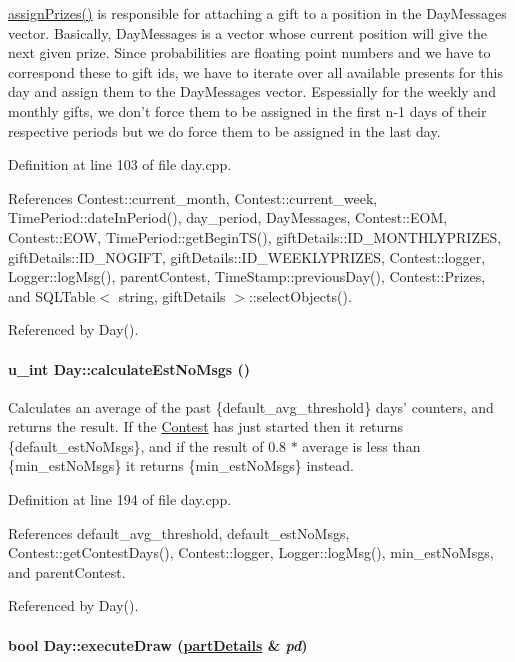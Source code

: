 \hyperlink{classDay_Daya5}{assign\-Prizes()} is responsible for attaching a gift to a position in the Day\-Messages vector. Basically, Day\-Messages is a vector whose current position will give the next given prize. Since probabilities are floating point numbers and we have to correspond these to gift ids, we have to iterate over all available presents for this day and assign them to the Day\-Messages vector. Espessially for the weekly and monthly gifts, we don't force them to be assigned in the first n-1 days of their respective periods but we do force them to be assigned in the last day. 

Definition at line 103 of file day.cpp.

References Contest::current\_\-month, Contest::current\_\-week, Time\-Period::date\-In\-Period(), day\_\-period, Day\-Messages, Contest::EOM, Contest::EOW, Time\-Period::get\-Begin\-TS(), gift\-Details::ID\_\-MONTHLYPRIZES, gift\-Details::ID\_\-NOGIFT, gift\-Details::ID\_\-WEEKLYPRIZES, Contest::logger, Logger::log\-Msg(), parent\-Contest, Time\-Stamp::previous\-Day(), Contest::Prizes, and SQLTable$<$ string, gift\-Details $>$::select\-Objects().

Referenced by Day().\hypertarget{classDay_Daya6}{
\paragraph[calculateEstNoMsgs]{\setlength{\rightskip}{0pt plus 5cm}u\_\-int Day::calculate\-Est\-No\-Msgs ()}\hfill}
\label{classDay_Daya6}


Calculates an average of the past \{default\_\-avg\_\-threshold\} days' counters, and returns the result. If the \hyperlink{classContest}{Contest} has just started then it returns \{default\_\-est\-No\-Msgs\}, and if the result of 0.8 $\ast$ average is less than \{min\_\-est\-No\-Msgs\} it returns \{min\_\-est\-No\-Msgs\} instead. 

Definition at line 194 of file day.cpp.

References default\_\-avg\_\-threshold, default\_\-est\-No\-Msgs, Contest::get\-Contest\-Days(), Contest::logger, Logger::log\-Msg(), min\_\-est\-No\-Msgs, and parent\-Contest.

Referenced by Day().\hypertarget{classDay_Daya8}{
\paragraph[executeDraw]{\setlength{\rightskip}{0pt plus 5cm}bool Day::execute\-Draw (\hyperlink{classpartDetails}{part\-Details} \& {\em pd})}\hfill}
\label{classDay_Daya8}


